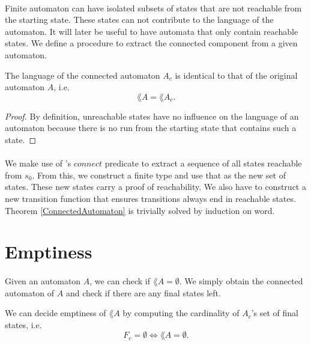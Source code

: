\documentclass[11pt,a4paper,oneside]{book}
\begin{document}
            \paragraph{} 
                Finite automaton can have isolated subsets of states that are not reachable from the starting state. 
                These states can not contribute to the language of the automaton. 
                It will later be useful to have automata that only contain reachable states. 
                We define a procedure to extract the connected component from a given automaton.

            \begin{theorem}
                \label{ConnectedAutomaton}
                The language of the connected automaton $A_c$ is identical to that of the original automaton $A$, i.e.
                \[
                    \lang{A} = \lang{A_c}.
                \]
            \end{theorem}
            
            \begin{proof}
                By definition, unreachable states have no influence on the language of an automaton because there is no run from the starting state that contains such a state.
            \end{proof}

            \paragraph{}
                We make use of \ssreflect's $connect$ predicate to extract a sequence of all states reachable from $s_0$. 
                From this, we construct a finite type and use that as the new set of states. 
                These new states carry a proof of reachability.
                We also have to construct a new transition function that ensures transitions always end in reachable states.
                Theorem \ref{ConnectedAutomaton} is trivially solved by induction on word.


        \section{Emptiness}
            \paragraph{}
                Given an automaton $A$, we can check if $\lang{A} = \emptyset$. We simply obtain the connected automaton of $A$ and check if there are any final states left. 
                \begin{theorem} We can decide emptiness of $\lang{A}$ by computing the cardinality of $A_c$'s set of final states, i.e.
                    \label{AutomatonEmpty}
                    \[
                        F_c = \emptyset \Longleftrightarrow \lang{A} = \emptyset.
                    \]
                \end{theorem}
\end{document}
